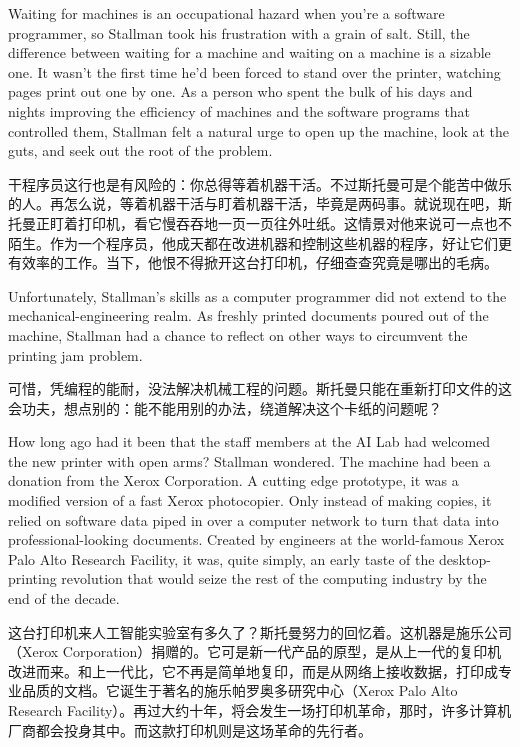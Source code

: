 \ifdefined\eng
Waiting for machines is an occupational hazard when you're a software programmer, so Stallman took his frustration with a grain of salt. Still, the difference between waiting for a machine and waiting on a machine is a sizable one. It wasn't the first time he'd been forced to stand over the printer, watching pages print out one by one. As a person who spent the bulk of his days and nights improving the efficiency of machines and the software programs that controlled them, Stallman felt a natural urge to open up the machine, look at the guts, and seek out the root of the problem.
\fi

\ifdefined\chs
干程序员这行也是有风险的：你总得等着机器干活。不过斯托曼可是个能苦中做乐的人。再怎么说，等着机器干活与盯着机器干活，毕竟是两码事。就说现在吧，斯托曼正盯着打印机，看它慢吞吞地一页一页往外吐纸。这情景对他来说可一点也不陌生。作为一个程序员，他成天都在改进机器和控制这些机器的程序，好让它们更有效率的工作。当下，他恨不得掀开这台打印机，仔细查查究竟是哪出的毛病。
\fi

\ifdefined\eng
Unfortunately, Stallman's skills as a computer programmer did not extend to the mechanical-engineering realm. As freshly printed documents poured out of the machine, Stallman had a chance to reflect on other ways to circumvent the printing jam problem.
\fi

\ifdefined\chs
可惜，凭编程的能耐，没法解决机械工程的问题。斯托曼只能在重新打印文件的这会功夫，想点别的：能不能用别的办法，绕道解决这个卡纸的问题呢？
\fi

\ifdefined\eng
How long ago had it been that the staff members at the AI Lab had welcomed the new printer with open arms? Stallman wondered. The machine had been a donation from the Xerox Corporation. A cutting edge prototype, it was a modified version of a fast Xerox photocopier. Only instead of making copies, it relied on software data piped in over a computer network to turn that data into professional-looking documents. Created by engineers at the world-famous Xerox Palo Alto Research Facility, it was, quite simply, an early taste of the desktop-printing revolution that would seize the rest of the computing industry by the end of the decade.
\fi

\ifdefined\chs
这台打印机来人工智能实验室有多久了？斯托曼努力的回忆着。这机器是施乐公司（Xerox Corporation）捐赠的。它可是新一代产品的原型，是从上一代的复印机改进而来。和上一代比，它不再是简单地复印，而是从网络上接收数据，打印成专业品质的文档。它诞生于著名的施乐帕罗奥多研究中心（Xerox Palo Alto Research Facility）。再过大约十年，将会发生一场打印机革命，那时，许多计算机厂商都会投身其中。而这款打印机则是这场革命的先行者。
\fi

